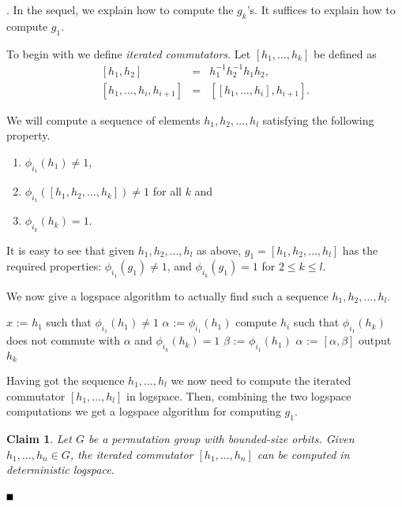 \documentclass[11pt]{article}
\newtheorem*{claim}{Claim}
\newcommand{\bproof}{\noindent{\it Proof}}
\newcommand{\eproof}{\hspace*{\fill}$\rule{2mm}{2mm}$~~~~~\bigskip}
\renewenvironment{proof}{\bproof. }{\eproof}
\newcommand{\commu}[1]
{\ensuremath{\left\lbrack #1 \right\rbrack}}
\begin{document}
\begin{proof}
In the sequel, we explain how to compute the $g_k$'s. It suffices to
explain how to compute $g_1$.

To begin with we define \emph{iterated commutators}. Let
$\commu{h_1,\ldots,h_k}$ be defined as
\begin{eqnarray*}
\commu{h_1,h_2} &=& h_1^{-1}h_2^{-1}h_1h_2,\\
\commu{h_1,\ldots,h_i,h_{i+1}} &=& \left[\commu{h_1,\ldots,h_i},h_{i+1}\right].
\end{eqnarray*}

We will compute a sequence of elements $h_1, h_2,\ldots,h_l$
satisfying the following property.

  \begin{enumerate}
  \item $\phi_{i_1}(h_1) \neq 1$,
  \item $\phi_{i_1}(\commu{h_1,h_2,\ldots,h_k}) \neq 1$ for all $k$
    and
  \item $\phi_{i_k}(h_k) = 1$.
  \end{enumerate}
  
  It is easy to see that given $h_1, h_2,\ldots,h_l$ as above, $g_1 =
  \commu{h_1,h_2,\ldots,h_l}$ has the required properties:
  $\phi_{i_1}(g_1) \neq 1$, and $\phi_{i_k}(g_1) =1$ for $2 \leq k
  \leq l$. 

We now give a logspace algorithm to actually find such a sequence
$h_1, h_2,\ldots,h_l$.

  \begin{algorithm}
    $x$ := $h_1$ such that $\phi_{i_1}(h_1) \neq 1$ \;
    $\alpha$ := $\phi_{i_1}(h_1)$\;
    { 
      compute $h_i$ such that $\phi_{i_1}(h_k)$ does not commute with
      $\alpha$ and $\phi_{i_k}(h_k) = 1$\; 
      $\beta$ := $\phi_{i_1}(h_1)$ \;
      $\alpha$ := $[\alpha,\beta]$ \;
      output $h_k$\;
    }
\end{algorithm}

Having got the sequence $h_1,\ldots,h_l$ we now need to compute the
iterated commutator $\commu{h_1,\ldots,h_l}$ in logspace. Then,
combining the two logspace computations we get a logspace algorithm
for computing $g_1$.

\begin{claim}{\label{lem-iter-commu}}
  Let $G$ be a permutation group with bounded-size orbits. Given
  $h_1,\ldots,h_n \in G$, the iterated commutator
  $\commu{h_1,\ldots,h_n}$ can be computed in deterministic logspace.
\end{claim}


\end{proof}
\end{document}
